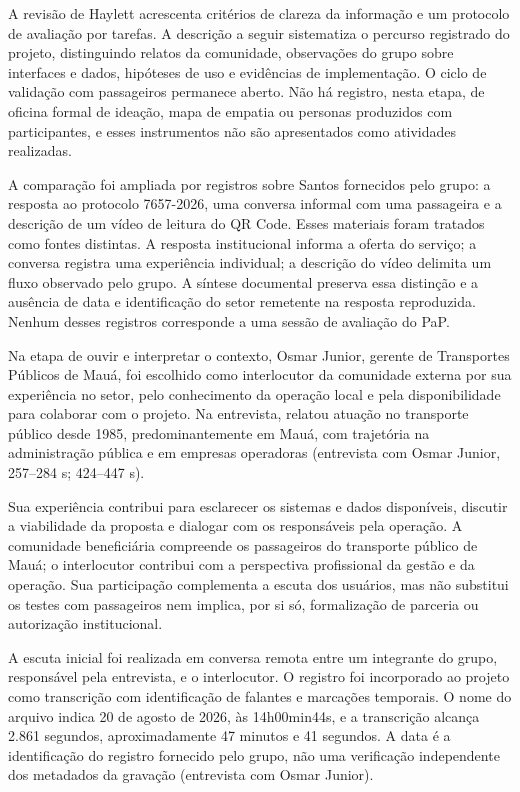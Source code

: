 \documentclass[12pt,oneside,a4paper,brazil,chapter=TITLE]{abntex2}
\begin{document}
A revisão de Haylett acrescenta critérios de clareza da informação e um protocolo de avaliação por tarefas. A descrição a seguir sistematiza o percurso registrado do projeto, distinguindo relatos da comunidade, observações do grupo sobre interfaces e dados, hipóteses de uso e evidências de implementação. O ciclo de validação com passageiros permanece aberto. Não há registro, nesta etapa, de oficina formal de ideação, mapa de empatia ou personas produzidos com participantes, e esses instrumentos não são apresentados como atividades realizadas.

A comparação foi ampliada por registros sobre Santos fornecidos pelo grupo: a resposta ao protocolo 7657-2026, uma conversa informal com uma passageira e a descrição de um vídeo de leitura do QR Code. Esses materiais foram tratados como fontes distintas. A resposta institucional informa a oferta do serviço; a conversa registra uma experiência individual; a descrição do vídeo delimita um fluxo observado pelo grupo. A síntese documental preserva essa distinção e a ausência de data e identificação do setor remetente na resposta reproduzida. Nenhum desses registros corresponde a uma sessão de avaliação do PaP.

\label{sec:escuta-comunidade}
Na etapa de ouvir e interpretar o contexto, Osmar Junior, gerente de Transportes Públicos de Mauá, foi escolhido como interlocutor da comunidade externa por sua experiência no setor, pelo conhecimento da operação local e pela disponibilidade para colaborar com o projeto. Na entrevista, relatou atuação no transporte público desde 1985, predominantemente em Mauá, com trajetória na administração pública e em empresas operadoras  (entrevista com Osmar Junior, 257--284 s; 424--447 s).

Sua experiência contribui para esclarecer os sistemas e dados disponíveis, discutir a viabilidade da proposta e dialogar com os responsáveis pela operação. A comunidade beneficiária compreende os passageiros do transporte público de Mauá; o interlocutor contribui com a perspectiva profissional da gestão e da operação. Sua participação complementa a escuta dos usuários, mas não substitui os testes com passageiros nem implica, por si só, formalização de parceria ou autorização institucional.

A escuta inicial foi realizada em conversa remota entre um integrante do grupo, responsável pela entrevista, e o interlocutor. O registro foi incorporado ao projeto como transcrição com identificação de falantes e marcações temporais. O nome do arquivo indica 20 de agosto de 2026, às 14h00min44s, e a transcrição alcança 2.861 segundos, aproximadamente 47 minutos e 41 segundos. A data é a identificação do registro fornecido pelo grupo, não uma verificação independente dos metadados da gravação  (entrevista com Osmar Junior).
\end{document}

